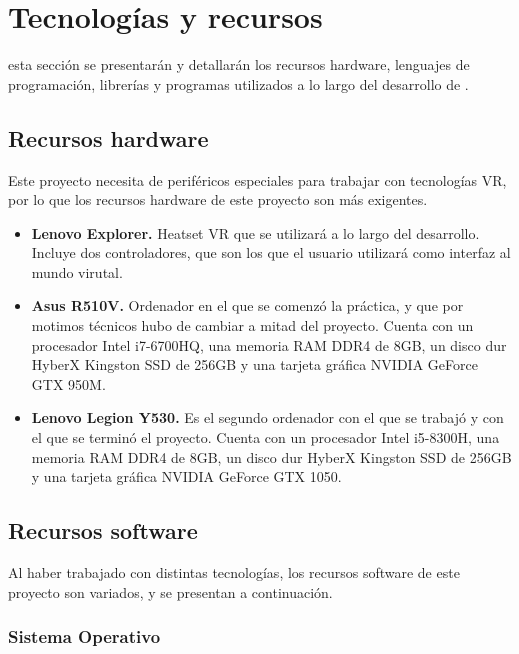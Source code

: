 \chapter{Tecnologías y recursos}
\label{chap:tecnologia}

 esta sección se presentarán y detallarán los recursos hardware, lenguajes de programación, librerías y programas utilizados a lo largo del desarrollo de \MineRVa.

\section{Recursos hardware}

Este proyecto necesita de periféricos especiales para trabajar con tecnologías \acs{VR}, por lo que los recursos hardware de este proyecto son más exigentes.

\begin{itemize}
 \item \textbf{Lenovo Explorer.} Heatset \acs{VR} que se utilizará a lo largo del desarrollo. Incluye dos controladores, que son los que el usuario utilizará como interfaz al mundo virutal.

 \item \textbf{Asus R510V.} Ordenador en el que se comenzó la práctica, y que por motimos técnicos hubo de cambiar a mitad del proyecto. Cuenta con un procesador Intel i7-6700HQ, una memoria RAM DDR4 de 8GB, un disco dur  HyberX Kingston SSD de 256GB y una tarjeta gráfica NVIDIA GeForce GTX 950M.
 
 \item \textbf{Lenovo Legion Y530.} Es el segundo ordenador con el que se trabajó y con el que se terminó el proyecto. Cuenta con un procesador Intel i5-8300H, una memoria RAM DDR4 de 8GB, un disco dur  HyberX Kingston SSD de 256GB y una tarjeta gráfica NVIDIA GeForce GTX 1050.
 
\end{itemize}

\section{Recursos software}

Al haber trabajado con distintas tecnologías, los recursos software de este proyecto son variados, y se presentan a continuación.

\subsection{Sistema Operativo}

